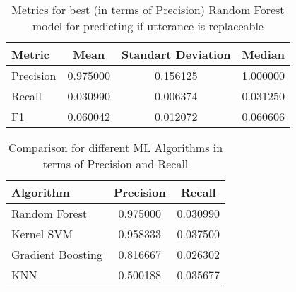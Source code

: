 \begin{table}[pt]
\caption{Metrics for best (in terms of Precision) Random Forest model for predicting if utterance is replaceable}
\label{TableMetricsRF} 
\begin{center}
\begin{tabular}{lccc}
\hline \bf Metric & Mean & Standart Deviation & Median  \\ \hline
Precision &  0.975000 &  0.156125 &  1.000000 \\
Recall &  0.030990 &  0.006374 &  0.031250 \\
F1 &  0.060042 &  0.012072 &  0.060606 \\
\hline
\end{tabular}
\end{center}
\end{table}


\begin{table}[pt]
\caption{Comparison for different ML Algorithms in terms of Precision and Recall}
\label{TableAlgos} 
\begin{center}
\begin{tabular}{lcc}
\hline \bf Algorithm &  Precision &    Recall \\\hline
Random Forest  &   0.975000 &  0.030990 \\
Kernel SVM &   0.958333 &  0.037500 \\
Gradient Boosting  &   0.816667 &  0.026302 \\
KNN &   0.500188 &  0.035677 \\
\hline
\end{tabular}
\end{center}
\end{table}

